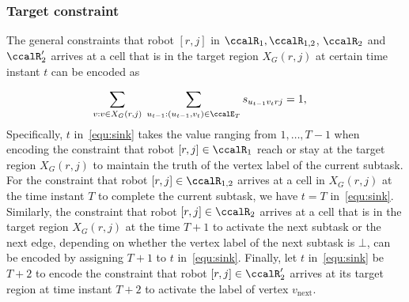 \documentclass[Afour,sageh,times]{sagej}
\begin{document}
{{\subsubsection{Target constraint}
The general constraints that robot $[r,j]$ in $\ccalR_1, \ccalR_{1,2}$, $\ccalR_2$ and $\ccalR'_{2}$ arrives at a cell that is in the target region $X_G(r,j)$ at certain time instant $t$ can be encoded as}
\begingroup\makeatletter{}\check@mathfonts
\def\maketag@@@#1{\hbox{\m@th\normalsize\normalfont#1}}%
\begingroup
  \begin{align}\label{equ:sink}
  \sum_{v: v \in X_G(r,j) } \;\sum_{u_{t-1}:(u_{t-1}, v_{t}) \in \ccalE_T} s_{u_{t-1} v_{t} rj} &  = 1,
  \end{align}
  \endgroup
 Specifically, $t$ in~\eqref{equ:sink} takes the value ranging from $1, \ldots, T-1$ when encoding the constraint that robot $[r,j] \in\ccalR_1$ reach or stay at the target region $X_G(r,j)$ to maintain the truth of  the vertex label of the current subtask.  For the constraint that robot $[r,j]\in\ccalR_{1,2}$ arrives at a cell in $X_G(r,j)$ at the time instant $T$ to complete the current subtask, we have $t = T$ in~\eqref{equ:sink}. Similarly,  the constraint that robot $[r,j] \in \ccalR_2$ arrives at a cell that is in the target region $X_G(r,j)$ at the time $T+1$ to activate the next subtask or the next edge, depending on whether the vertex label of the next subtask is $\bot$, can be encoded by assigning $T+1$ to $t$ in~\eqref{equ:sink}. Finally, let $t$ in~\eqref{equ:sink} be $T+2$ to encode the constraint that robot $[r,j]\in \ccalR'_{2}$ arrives at its target region at time instant $T+2$ to activate the label of vertex $v_{\text{next}}$.

}
\end{document}
